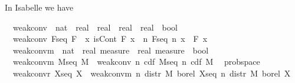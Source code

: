\documentclass{article}
\theoremstyle{definition}
\begin{document}
In Isabelle we have

\medskip

\begin{isabellebody}
\isamarkupfalse%
\isanewline
\ \ weak{\isacharunderscore}conv\ {\isacharcolon}{\isacharcolon}\ {\isachardoublequoteopen}{\isacharparenleft}nat\ {\isasymRightarrow}\ {\isacharparenleft}real\ {\isasymRightarrow}\ real{\isacharparenright}{\isacharparenright}\ {\isasymRightarrow}\ {\isacharparenleft}real\ {\isasymRightarrow}\ real{\isacharparenright}\ {\isasymRightarrow}\ bool{\isachardoublequoteclose}\isanewline
{}\isanewline
\ \ {\isachardoublequoteopen}weak{\isacharunderscore}conv\ F{\isacharunderscore}seq\ F\ {\isasymequiv}\ {\isasymforall}x{\isachardot}\ isCont\ F\ x\ {\isasymlongrightarrow}\ {\isacharparenleft}{\isasymlambda}n{\isachardot}\ F{\isacharunderscore}seq\ n\ x{\isacharparenright}\ {\isacharminus}{\isacharminus}{\isacharminus}{\isacharminus}{\isachargreater}\ F\ x{\isachardoublequoteclose}\isanewline\isanewline
{}\isamarkupfalse%
\isanewline
\ \ weak{\isacharunderscore}conv{\isacharunderscore}m\ {\isacharcolon}{\isacharcolon}\ {\isachardoublequoteopen}{\isacharparenleft}nat\ {\isasymRightarrow}\ real\ measure{\isacharparenright}\ {\isasymRightarrow}\ real\ measure\ {\isasymRightarrow}\ bool{\isachardoublequoteclose}\isanewline
{}\isanewline
\ \ {\isachardoublequoteopen}weak{\isacharunderscore}conv{\isacharunderscore}m\ M{\isacharunderscore}seq\ M\ {\isasymequiv}\ weak{\isacharunderscore}conv\ {\isacharparenleft}{\isasymlambda}n{\isachardot}\ cdf\ {\isacharparenleft}M{\isacharunderscore}seq\ n{\isacharparenright}{\isacharparenright}\ {\isacharparenleft}cdf\ M{\isacharparenright}{\isachardoublequoteclose}\isanewline\isanewline
{}\isamarkupfalse%
\ {\isacharparenleft}\ prob{\isacharunderscore}space{\isacharparenright}\isanewline
\ \ {\isachardoublequoteopen}weak{\isacharunderscore}conv{\isacharunderscore}r\ X{\isacharunderscore}seq\ X\ {\isasymequiv}\ weak{\isacharunderscore}conv{\isacharunderscore}m\ {\isacharparenleft}{\isasymlambda}n{\isachardot}\ distr\ M\ borel\ {\isacharparenleft}X{\isacharunderscore}seq\ n{\isacharparenright}{\isacharparenright}\ {\isacharparenleft}distr\ M\ borel\ X{\isacharparenright}{\isachardoublequoteclose}
\end{isabellebody}

\medskip
\end{document}
